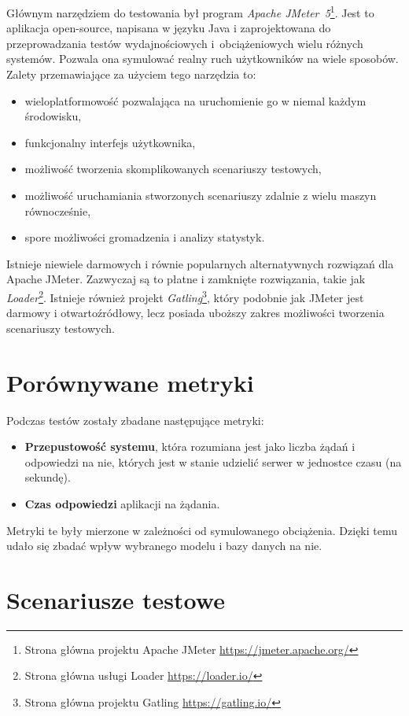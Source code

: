 Głównym narzędziem do testowania był program \textit{Apache JMeter~5}\footnote{Strona główna projektu Apache JMeter \url{https://jmeter.apache.org/}}.
Jest to aplikacja open-source, napisana w języku Java i zaprojektowana do przeprowadzania testów wydajnościowych i~obciążeniowych wielu różnych systemów.
Pozwala ona symulować realny ruch użytkowników na wiele sposobów.
Zalety przemawiające za użyciem tego narzędzia to:
\begin{itemize}
    \item wieloplatformowość pozwalająca na uruchomienie go w niemal każdym środowisku,
    \item funkcjonalny interfejs użytkownika,
    \item możliwość tworzenia skomplikowanych scenariuszy testowych,
    \item możliwość uruchamiania stworzonych scenariuszy zdalnie z wielu maszyn równocześnie,
    \item spore możliwości gromadzenia i analizy statystyk.
\end{itemize}

Istnieje niewiele darmowych i równie popularnych alternatywnych rozwiązań dla Apache JMeter. 
Zazwyczaj są to płatne i zamknięte rozwiązania, takie jak \textit{Loader}\footnote{Strona główna usługi Loader \url{https://loader.io/}}.
Istnieje również projekt \textit{Gatling}\footnote{Strona główna projektu Gatling \url{https://gatling.io/}}, który podobnie jak JMeter jest darmowy i otwartoźródłowy, lecz posiada uboższy zakres możliwości tworzenia scenariuszy testowych.

\section{Porównywane metryki}

Podczas testów zostały zbadane następujące metryki:
\begin{itemize}
    \item \textbf{Przepustowość systemu}, która rozumiana jest jako liczba żądań i odpowiedzi na nie, których jest w stanie udzielić serwer w jednostce czasu (na sekundę).
    \item \textbf{Czas odpowiedzi} aplikacji na żądania.
\end{itemize}

Metryki te były mierzone w zależności od symulowanego obciążenia.
Dzięki temu udało się zbadać wpływ wybranego modelu i bazy danych na nie.

\section{Scenariusze testowe}


